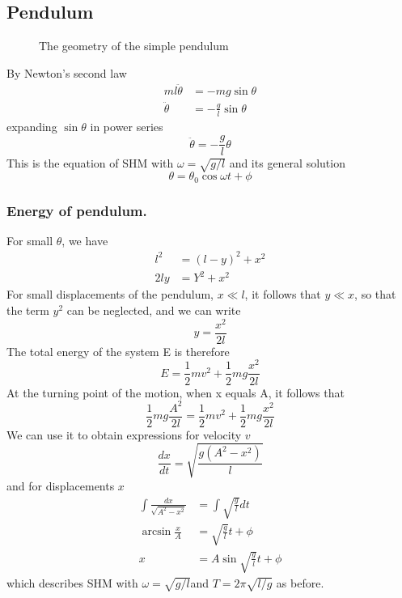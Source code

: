 \documentclass[../../../main.tex]{subfiles}
\begin{document}
\subsection{Pendulum}
\begin{figure*}[b]
    \centering
    \caption*{The geometry of the simple pendulum}
\end{figure*}
By Newton's second law 
\begin{align*}
    ml\ddot{\theta}&=-mg\sin\theta\\
\ddot{\theta}&=-\frac{g}{l}\sin \theta
\end{align*}
expanding $\sin\theta $ in power series
\begin{equation*}
    \ddot{\theta}=-\frac{g}{l}\theta
\end{equation*}
This is the equation of SHM with $ \omega=\sqrt{g/ l}$ and its general solution 
\begin{equation*}
    \theta=\theta_0 \cos \omega t +\phi
\end{equation*}

\subsubsection{Energy of pendulum.} For small $\theta$, we have
\begin{align*}
    l^2& = (l - y)^2 + x^2\\
    2ly&=Y^2+x^2
\end{align*}
For small displacements of the pendulum, $x\ll l $, it follows that $ y \ll x$, so that the term $y^2$ can be neglected, and we can write
\begin{equation*}
    y=\frac{x^2}{2l}
\end{equation*}
The total energy of the system E is therefore\begin{equation*}
    E=\frac{1}{2}mv^2+\frac{1}{2}mg\frac{x^2}{2l}
\end{equation*}
At the turning point of the motion, when x equals A, it follows that
\begin{equation*}
    \frac{1}{2}mg\frac{A^2}{2l}=\frac{1}{2}mv^2+\frac{1}{2}mg\frac{x^2}{2l}
\end{equation*}
We can use it to obtain expressions for velocity $v$ 
\begin{equation*}
    \frac{dx}{dt}=\sqrt{\frac{g(A^2-x^2)}{l}}
\end{equation*}
and for displacements $x$
\begin{align*}
    \int \frac{dx}{\sqrt{A^2-x^2}}&=\int \sqrt{\frac{g}{l}}dt\\
    \arcsin \frac{x}{A}&= \sqrt{\frac{g}{l}}t+\phi\\
    x&=A\sin \sqrt{\frac{g}{l}}t+\phi
\end{align*}
which describes SHM with $\omega = \sqrt{g/ l} $and $T = 2\pi \sqrt{l/g}$ as before.
\end{document}
